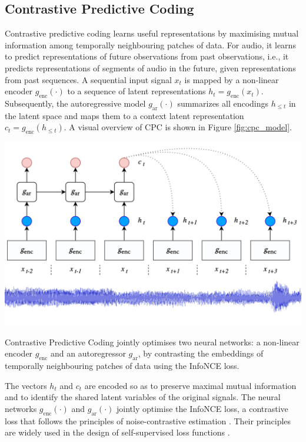 \subsection{Contrastive Predictive Coding}\label{sec:cpc}
Contrastive predictive coding learns useful representations by maximising mutual information among temporally neighbouring patches of data.
For audio, it learns to predict representations of future observations from past observations, i.e., it predicts representations of segments of audio in the future, given representations from past sequences.
A sequential input signal $x_t$ is mapped by a non-linear encoder $g_{\mathrm{enc}}(\cdot)$ to a sequence of latent representations $h_t = g_{\mathrm{enc}}(x_t)$. Subsequently, the autoregressive model $g_{\mathrm{ar}}(\cdot)$ summarizes all encodings $h_{\leq t}$ in the latent space and maps them to a context latent representation $c_t = g_{\mathrm{enc}}(h_{\leq t})$. A visual overview of CPC is shown in Figure \ref{fig:cpc_model}.


\begin{marginfigure}[{-1cm}]
    \includegraphics[width=\textwidth]{figs/cpc_model.png}
    \caption{Contrastive Predictive Coding jointly optimises two neural networks: a non-linear encoder $g_{\mathrm{enc}}$ and an autoregressor $g_{\mathrm{ar}}$, by contrasting the embeddings of temporally neighbouring patches of data using the InfoNCE loss.}
    \label{fig:cpc_model}
\end{marginfigure}

The vectors $h_t$ and $c_t$ are encoded so as to preserve maximal mutual information and to identify the shared latent variables of the original signals. The neural networks $g_{\mathrm{enc}}(\cdot)$ and $g_{\mathrm{ar}}(\cdot)$ jointly optimise the InfoNCE loss, a contrastive loss that follows the principles of noise-contrastive estimation \cite{gutmann_noise-contrastive_nodate}. Their principles are widely used in the design of self-supervised loss functions \cite{oord_representation_2019, sohn2020fixmatch, chen_simple_2020}.

